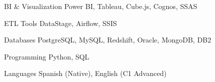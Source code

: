 

\begin{cvskills}

  \cvskill
    {BI \& Visualization} %
    {Power BI, Tableau, Cube.js, Cognos, SSAS} %

  \cvskill
    {ETL Tools} %
    {DataStage, Airflow, SSIS} %

  \cvskill
    {Databases} %
    {PostgreSQL, MySQL, Redshift, Oracle, MongoDB, DB2} %

  \cvskill
    {Programming} %
    {Python, SQL} %

  \cvskill
    {Languages} %
    {Spanish (Native), English (C1 Advanced)} %

\end{cvskills}
